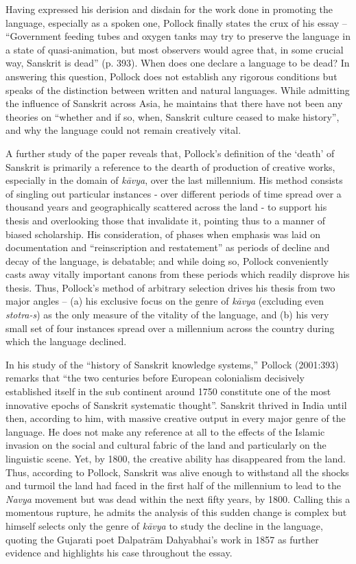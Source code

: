 Having expressed his derision and disdain for the work done in promoting the language, especially as a spoken one, Pollock finally states the crux of his essay – “Government feeding tubes and oxygen tanks may try to preserve the language in a state of quasi-animation, but most observers would agree that, in some crucial way, Sanskrit is dead” (p. 393). When does one declare a language to be dead? In answering this question, Pollock does not establish any rigorous conditions but speaks of the distinction between written and natural languages. While admitting the influence of Sanskrit across Asia, he maintains that there have not been any theories on “whether and if so, when, Sanskrit culture ceased to make history”, and why the language could not remain creatively vital.

A further study of the paper reveals that, Pollock’s definition of the ‘death’ of Sanskrit is primarily a reference to the dearth of production of creative works, especially in the domain of {\sl kāvya}, over the last millennium. His method consists of singling out particular instances - over different periods of time spread over a thousand years and geographically scattered across the land - to support his thesis and overlooking those that invalidate it, pointing thus to a manner of biased scholarship. His consideration, of phases when emphasis was laid on documentation and “reinscription and restatement” as periods of decline and decay of the language, is debatable; and while doing so, Pollock conveniently casts away vitally important canons from these periods which readily disprove his thesis. Thus, Pollock’s method of arbitrary selection drives his thesis from two major angles – (a) his exclusive focus on the genre of {\sl kāvya} (excluding even {\sl stotra-s}) as the only measure of the vitality of the language, and (b) his very small set of four instances spread over a millennium across the country during which the language declined.

In his study of the “history of Sanskrit knowledge systems,” Pollock (2001:393) remarks that “the two centuries before European colonialism decisively established itself in the sub continent around 1750 constitute one of the most innovative epochs of Sanskrit systematic thought”. Sanskrit thrived in India until then, according to him, with massive creative output in every major genre of the language. He does not make any reference at all to the effects of the Islamic invasion on the social and cultural fabric of the land and particularly on the linguistic scene. Yet, by 1800, the creative ability has disappeared from the land. Thus, according to Pollock, Sanskrit was alive enough to withstand all the shocks and turmoil the land had faced in the first half of the millennium to lead to the {\sl Navya} movement but was dead within the next fifty years, by 1800. Calling this a momentous rupture, he admits the analysis of this sudden change is complex but himself selects only the genre of {\sl kāvya} to study the decline in the language, quoting the Gujarati poet Dalpatrām Dahyabhai’s work in 1857 as further evidence and  highlights his case throughout the essay.

